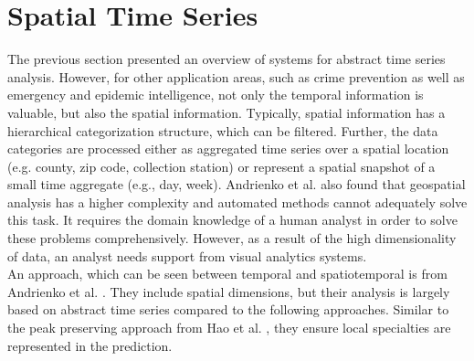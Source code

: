 \documentclass[electronic]{vgtc}             %
\begin{document}
\section{Spatial Time Series\label{sec:spatiotemp}}
The previous section presented an overview of systems for abstract time series analysis. 
However, for other application areas, such as crime prevention as well as emergency and epidemic intelligence, not only the temporal information is valuable, but also the spatial information.
Typically, spatial information has a hierarchical categorization structure, which can be filtered.
Further, the data categories are processed either as aggregated time series over a spatial location (e.g. county, zip code, collection station) or represent a spatial snapshot of a small time aggregate (e.g., day, week).
Andrienko et al. \cite{Andrienko:2008, Andrienko:2010:Space} also found that geospatial analysis has a higher complexity and automated methods cannot adequately solve this task. 
It requires the domain knowledge of a human analyst in order to solve these problems comprehensively.
However, as a result of the high dimensionality of data, an analyst needs support from visual analytics systems.\\

An approach, which can be seen between temporal and spatiotemporal is from Andrienko et al. \cite{Andrienko:2010}. 
They include spatial dimensions, but their analysis is largely based on abstract time series compared to the following approaches.
Similar to the peak preserving approach from Hao et al. \cite{Hao:2009,Hao:2011,Hao:2012}, they ensure local specialties are represented in the prediction. 
\end{document}
